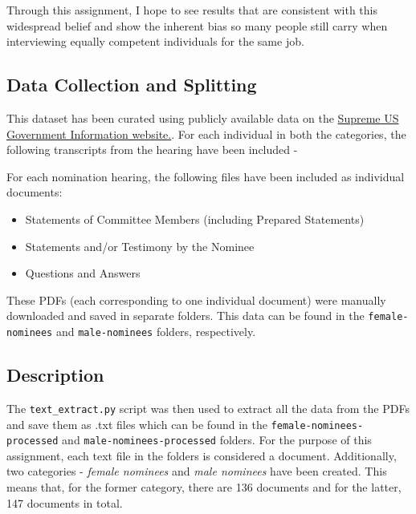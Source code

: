 \documentclass[titlepage]{article}
\begin{document}
Through this assignment, I hope to see results that are consistent with this widespread belief and show the inherent bias so many 
people still carry when interviewing equally competent individuals for the same job.

\subsection{Data Collection and Splitting}
This dataset has been curated using publicly available data on the \href{https://www.govinfo.gov/collection/supreme-court-nomination-
hearings}{Supreme US Government Information website.}. For each individual in both the categories, the following transcripts from the
hearing have been included - 

For each nomination hearing, the following files have been included as individual documents:
\begin{itemize}
    \item Statements of Committee Members (including Prepared Statements)
    \item Statements and/or Testimony by the Nominee
    \item Questions and Answers
\end{itemize}

These PDFs (each corresponding to one individual document) were manually downloaded and saved in separate 
folders. This data can be found in the \texttt{female-nominees} and \texttt{male-nominees} folders, respectively.

\subsection{Description}
The \texttt{text\_extract.py} script was then used to extract all the data from the PDFs and save them as .txt files which can be found
in the \texttt{female-nominees-processed} and \texttt{male-nominees-processed} folders. For the purpose of this assignment, each text file 
in the folders is considered a document. Additionally, two categories - \emph{female nominees} and \emph{male nominees} have been created.
This means that, for the former category, there are 136 documents and for the latter, 147 documents in total. \\
\end{document}
